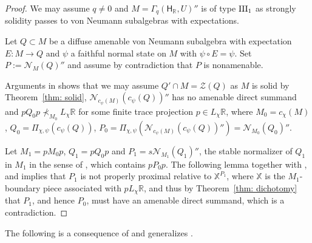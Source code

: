 \documentclass[a4paper,11pt]{amsart}
\theoremstyle{definition}
\newcommand{\R}{{\mathbb R}}
\newcommand{\X}{{\mathbb X}}
\newcommand{\cN}{{\mathcal N}}
\newcommand{\cZ}{{\mathcal Z}}
\newcommand{\sH}{\mathsf{H}}
\begin{document}
\begin{proof}
We may assume $q\neq 0$ and $M=\Gamma_q(\sH_\R, U)''$ is of type ${\rm III}_1$ 
	as strongly solidity passes to von Neumann subalgebras with expectations.

Let $Q\subset M$ be a diffuse amenable von Neumann subalgebra with expectation $E: M\to Q$ and $\psi$ a faithful normal state on $M$ with $\psi\circ E=\psi$.
Set $P:=\cN_M(Q)''$ and assume by contradiction that $P$ is nonamenable.

Arguments in \cite[Proof of the main theorem]{BHV18} shows that we may assume $Q'\cap M=\cZ(Q)$ as $M$ is solid by Theorem~\ref{thm: solid},
	 $\cN_{c_\psi(M)}(c_\psi(Q))''$ has no amenable direct summand
	 and $pQ_0p\not\prec_{M_0} L_\chi\R$ for some finite trace projection $p\in L_\chi\R$,
	 where $M_0=c_{\chi}(M)$, $Q_0=\Pi_{\chi,\psi}(c_\psi(Q))$, $P_0=\Pi_{\chi,\psi}(\cN_{c_\psi(M)}(c_\psi(Q))'')=\cN_{M_0}(Q_0)''$.

Let $M_1= p M_0 p$, $Q_1=p Q_0 p$ and $P_1=s\cN_{M_1}(Q_1)''$, the stable normalizer of $Q_1$ in $M_1$ in the sense of
	\cite[Definition 3.1]{BHV18}, which contains $p P_0 p$.
The following lemma together with \cite[Proposition 5.3]{HoRa15}, \cite{ABW18} and \cite{AD95} implies that $P_1$ is not properly proximal relative to $\X^{P_1}$,
	where $\X$ is the $M_1$-boundary piece associated with $pL_\chi\R$,
	and thus by Theorem~\ref{thm: dichotomy} that $P_1$, and hence $P_0$, must have an amenable direct summand,
	which is a contradiction.
\end{proof}

The following is a consequence of \cite[Proposition 3.6]{BHV18} and generalizes \cite[Theorem 6.11]{DKEP22}.
\end{document}
